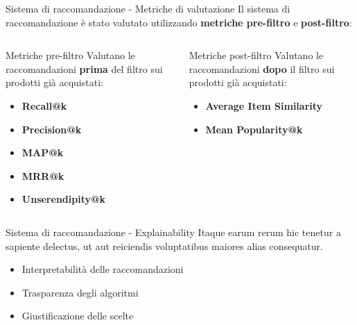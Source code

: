 \documentclass{beamer}
\begin{document}
	\begin{frame}{Sistema di raccomandazione - Metriche di valutazione}
		Il sistema di raccomandazione è stato valutato utilizzando \textbf{metriche pre-filtro} e \textbf{post-filtro}:

		\begin{columns}
			\begin{column}{0.5\textwidth}
				\begin{exampleblock}{Metriche pre-filtro}
					Valutano le raccomandazioni \textbf{prima} del filtro sui prodotti già acquistati:
					\begin{itemize}
						\item \textbf{Recall@k}
						\item \textbf{Precision@k}
						\item \textbf{MAP@k}
						\item \textbf{MRR@k}
						\item \textbf{Unserendipity@k}
					\end{itemize}
				\end{exampleblock}
			\end{column}
			\begin{column}{0.5\textwidth}
				\begin{exampleblock}{Metriche post-filtro}
					Valutano le raccomandazioni \textbf{dopo} il filtro sui prodotti già acquistati:
					\begin{itemize}
						\item \textbf{Average Item Similarity}
						\item \textbf{Mean Popularity@k}
					\end{itemize}
				\end{exampleblock}
			\end{column}
		\end{columns}
	\end{frame}

	\begin{frame}{Sistema di raccomandazione - Explainability}
		Itaque earum rerum hic tenetur a sapiente delectus, ut aut reiciendis voluptatibus maiores alias consequatur.

		\begin{itemize}
			\item Interpretabilità delle raccomandazioni
			\item Trasparenza degli algoritmi
			\item Giustificazione delle scelte
		\end{itemize}
	\end{frame}
\end{document}
